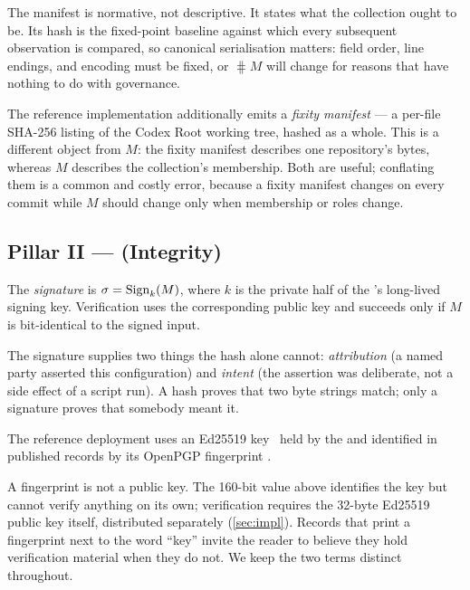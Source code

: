 \documentclass[11pt,a4paper]{article}
\begin{document}
The manifest is normative, not descriptive. It states what the collection
ought to be. Its hash is the fixed-point baseline against which every
subsequent observation is compared, so canonical serialisation matters: field
order, line endings, and encoding must be fixed, or $\hash{M}$ will change
for reasons that have nothing to do with governance.

\begin{remark}
The reference implementation additionally emits a \emph{fixity manifest} --- a
per-file SHA-256 listing of the Codex Root working tree, hashed as a whole.
This is a different object from $M$: the fixity manifest describes one
repository's bytes, whereas $M$ describes the collection's membership. Both
are useful; conflating them is a common and costly error, because a fixity
manifest changes on every commit while $M$ should change only when membership
or roles change.
\end{remark}

\subsection{Pillar II --- \Signature{} (Integrity)}

\begin{definition}[Signature]
\label{def:signature}
The \emph{signature} is $\sigma = \sign{M}{k}$, where $k$ is the private half
of the \Operator{}'s long-lived signing key. Verification uses the
corresponding public key and succeeds only if $M$ is bit-identical to the
signed input.
\end{definition}

The signature supplies two things the hash alone cannot: \emph{attribution}
(a named party asserted this configuration) and \emph{intent} (the assertion
was deliberate, not a side effect of a script run). A hash proves that two
byte strings match; only a signature proves that somebody meant it.

The reference deployment uses an Ed25519 key~\cite{rfc8032} held by the
\Operator{} and identified in published records by its OpenPGP fingerprint
\digest{\operatorfingerprint}.

\begin{remark}[On identifiers]
\label{rem:identifier}
A fingerprint is not a public key. The 160-bit value above identifies the key
but cannot verify anything on its own; verification requires the 32-byte
Ed25519 public key itself, distributed separately (\cref{sec:impl}). Records
that print a fingerprint next to the word ``key'' invite the reader to
believe they hold verification material when they do not. We keep the two
terms distinct throughout.
\end{remark}
\end{document}
